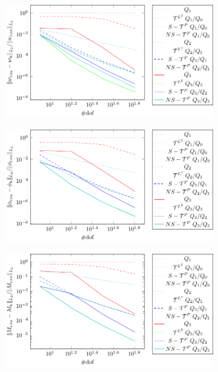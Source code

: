 \documentclass{article}
\begin{document}
\begin{figure}
    \centering
    \begin{subfigure}[b]{0.49\linewidth}        %
        \centering
        \includegraphics[width=\linewidth]{w-sin}
        \caption{}
        \vspace*{2mm}
    \end{subfigure}
    \begin{subfigure}[b]{0.49\linewidth}        %
        \centering
        \includegraphics[width=\linewidth]{phi-sin}
        \caption{}
        \vspace*{2mm}
    \end{subfigure}
        \begin{subfigure}[b]{0.49\linewidth}        %
        \centering
        \includegraphics[width=\linewidth]{M-sin}

\end{subfigure}
\end{figure}
\end{document}
